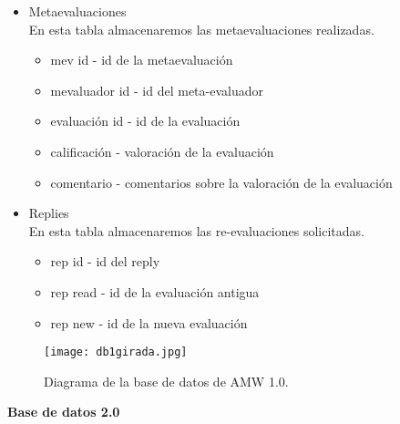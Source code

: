 \begin{itemize}
	\item Metaevaluaciones\\
	
	En esta tabla almacenaremos las metaevaluaciones realizadas.
	
	\begin{itemize}
		\item mev id - id de la metaevaluación
		\item mevaluador id - id del meta-evaluador
		\item evaluación id - id de la evaluación
		\item calificación - valoración de la evaluación
		\item comentario - comentarios sobre la valoración de la evaluación
	\end{itemize}
	
	
	\item Replies\\
	
	En esta tabla almacenaremos las re-evaluaciones solicitadas.
	
	\begin{itemize}
		\item rep id - id del reply
		\item rep read - id de la evaluación antigua
		\item rep new - id de la nueva evaluación
	\end{itemize}
	

	
\end{itemize}

\begin{figure} [h]
	\centering
	\texttt{[image: db1girada.jpg]}
	\caption{Diagrama de la base de datos de AMW 1.0.}
\end{figure}

\clearpage

\textbf{Base de datos 2.0}\\
	
